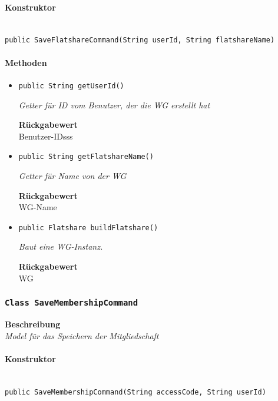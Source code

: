      \paragraph*{Konstruktor}\mbox{} \\
     \texttt{public SaveFlatshareCommand(String userId, String flatshareName)} \\
     \paragraph*{Methoden}
     \begin{itemize}
     	\item{\texttt{public String getUserId()}}
     	
     	\textit{Getter für ID vom Benutzer, der die WG erstellt hat}
     	
     	
     	
     	\textbf{Rückgabewert} \\
     	Benutzer-IDsss        \item{\texttt{public String getFlatshareName()}}
     	
     	\textit{Getter für Name von der WG}
     	
     	
     	
     	\textbf{Rückgabewert} \\
     	WG-Name        \item{\texttt{public Flatshare buildFlatshare()}}
     	
     	\textit{Baut eine WG-Instanz.}
     	
     	
     	
     	\textbf{Rückgabewert} \\
     	WG
     \end{itemize}
     \subsubsection{\texttt{Class SaveMembershipCommand}}
     \textbf{Beschreibung} \\
     \textit{Model für das Speichern der Mitgliedschaft}
     \paragraph*{Konstruktor}\mbox{} \\
     \texttt{public SaveMembershipCommand(String accessCode, String userId)} \\
